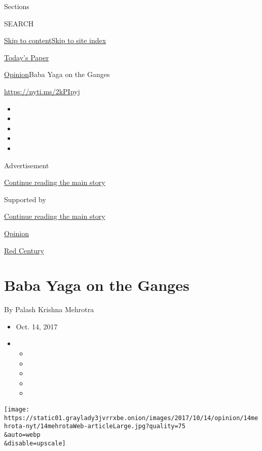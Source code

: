 Sections

SEARCH

\protect\hyperlink{site-content}{Skip to
content}\protect\hyperlink{site-index}{Skip to site index}

\href{https://myaccount.nytimes3xbfgragh.onion/auth/login?response_type=cookie\&client_id=vi}{}

\href{https://www.nytimes3xbfgragh.onion/section/todayspaper}{Today's
Paper}

\href{/section/opinion}{Opinion}\textbar{}Baba Yaga on the Ganges

\url{https://nyti.ms/2kPIpyj}

\begin{itemize}
\item
\item
\item
\item
\item
\end{itemize}

Advertisement

\protect\hyperlink{after-top}{Continue reading the main story}

Supported by

\protect\hyperlink{after-sponsor}{Continue reading the main story}

\href{/section/opinion}{Opinion}

\href{/column/red-century}{Red Century}

\hypertarget{baba-yaga-on-the-ganges}{%
\section{Baba Yaga on the Ganges}\label{baba-yaga-on-the-ganges}}

By Palash Krishna Mehrotra

\begin{itemize}
\item
  Oct. 14, 2017
\item
  \begin{itemize}
  \item
  \item
  \item
  \item
  \item
  \end{itemize}
\end{itemize}

\texttt{[image: https://static01.graylady3jvrrxbe.onion/images/2017/10/14/opinion/14mehrota-nyt/14mehrotaWeb-articleLarge.jpg?quality=75\\\&auto=webp\\\&disable=upscale]}

